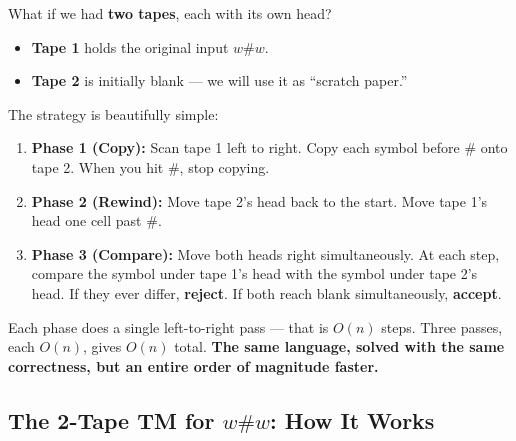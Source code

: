 What if we had \textbf{two tapes}, each with its own head?

\begin{itemize}[nosep]
\item \textbf{Tape 1} holds the original input $w\#w$.
\item \textbf{Tape 2} is initially blank --- we will use it as ``scratch paper.''
\end{itemize}

The strategy is beautifully simple:
\begin{enumerate}[nosep]
\item \textbf{Phase 1 (Copy):} Scan tape 1 left to right. Copy each symbol before $\#$ onto tape 2. When you hit $\#$, stop copying.
\item \textbf{Phase 2 (Rewind):} Move tape 2's head back to the start. Move tape 1's head one cell past $\#$.
\item \textbf{Phase 3 (Compare):} Move both heads right simultaneously. At each step, compare the symbol under tape 1's head with the symbol under tape 2's head. If they ever differ, \textbf{reject}. If both reach blank simultaneously, \textbf{accept}.
\end{enumerate}

Each phase does a single left-to-right pass --- that is $O(n)$ steps. Three passes, each $O(n)$, gives $O(n)$ total. \textbf{The same language, solved with the same correctness, but an entire order of magnitude faster.}



\subsection{The 2-Tape TM for $w\#w$: How It Works}

